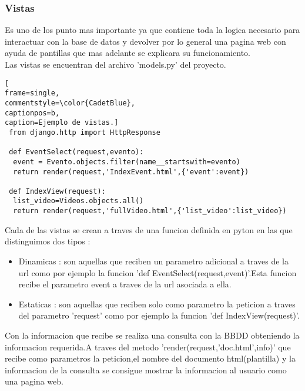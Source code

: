 \subsubsection{Vistas}
Es uno de los punto mas importante ya que contiene toda la logica necesario para interactuar con la base de datos y devolver por lo general una pagina web con ayuda de pantillas que mas adelante se explicara su funcionamiento.
\\Las vistas se encuentran del archivo 'models.py' del proyecto.
\begin{lstlisting}[
frame=single,
commentstyle=\color{CadetBlue},
captionpos=b,
caption=Ejemplo de vistas.]
 from django.http import HttpResponse 

 def EventSelect(request,evento):
  event = Evento.objects.filter(name__startswith=evento)
  return render(request,'IndexEvent.html',{'event':event})
    
 def IndexView(request):
  list_video=Videos.objects.all()
  return render(request,'fullVideo.html',{'list_video':list_video})
\end{lstlisting}
Cada de las vistas se crean a traves de una funcion definida en pyton  en las que distinguimos dos tipos :
\begin{itemize}
\item Dinamicas : son aquellas que reciben un parametro adicional a traves de la url como por ejemplo la funcion 'def EventSelect(request,event)'.Esta funcion recibe el parametro event a traves de la url asociada a ella.
\item Estaticas : son aquellas que reciben solo como parametro la peticion a traves del parametro 'request' como por ejemplo la funcion 'def IndexView(request)'.
\end{itemize}
Con la informacion que recibe se realiza una consulta con la BBDD obteniendo la informacion requerida.A traves del metodo 'render(request,'doc.html',info)' que recibe como parametros la peticion,el nombre del documento html(plantilla) y la informacion de la consulta se consigue mostrar la informacion al usuario como una pagina web.

